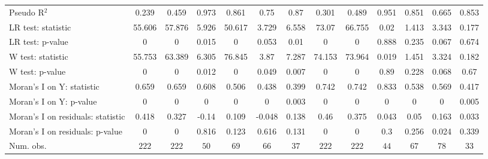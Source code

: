 \begin{table}
\begin{center}
\begin{tabular}{l c c c c c c c c c c c c}
Pseudo R$^2$                      & 0.239         & 0.459         & 0.973         & 0.861          & 0.75          & 0.87          & 0.301         & 0.489         & 0.951         & 0.851         & 0.665         & 0.853          \\
LR test: statistic                & 55.606        & 57.876        & 5.926         & 50.617         & 3.729         & 6.558         & 73.07         & 66.755        & 0.02          & 1.413         & 3.343         & 0.177          \\
LR test: p-value                  & 0             & 0             & 0.015         & 0              & 0.053         & 0.01          & 0             & 0             & 0.888         & 0.235         & 0.067         & 0.674          \\
W test: statistic                 & 55.753        & 63.389        & 6.305         & 76.845         & 3.87          & 7.287         & 74.153        & 73.964        & 0.019         & 1.451         & 3.324         & 0.182          \\
W test: p-value                   & 0             & 0             & 0.012         & 0              & 0.049         & 0.007         & 0             & 0             & 0.89          & 0.228         & 0.068         & 0.67           \\
Moran's I on Y: statistic         & 0.659         & 0.659         & 0.608         & 0.506          & 0.438         & 0.399         & 0.742         & 0.742         & 0.833         & 0.538         & 0.569         & 0.417          \\
Moran's I on Y: p-value           & 0             & 0             & 0             & 0              & 0             & 0.003         & 0             & 0             & 0             & 0             & 0             & 0.005          \\
Moran's I on residuals: statistic & 0.418         & 0.327         & -0.14         & 0.109          & -0.048        & 0.138         & 0.46          & 0.375         & 0.043         & 0.05          & 0.163         & 0.033          \\
Moran's I on residuals: p-value   & 0             & 0             & 0.816         & 0.123          & 0.616         & 0.131         & 0             & 0             & 0.3           & 0.256         & 0.024         & 0.339          \\
Num. obs.                         & $222$         & $222$         & $50$          & $69$           & $66$          & $37$          & $222$         & $222$         & $44$          & $67$          & $78$          & $33$           \\

\end{tabular}
\end{center}
\end{table}
